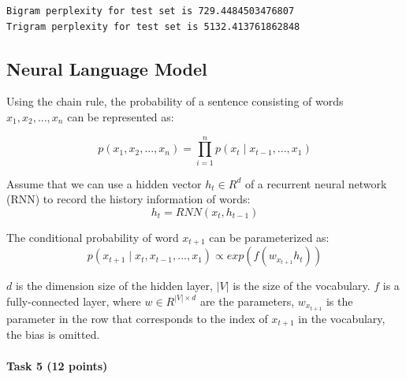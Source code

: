 \documentclass[11pt]{article}
\begin{document}
    \begin{Verbatim}[commandchars=\\\{\}]
Bigram perplexity for test set is 729.4484503476807
Trigram perplexity for test set is 5132.413761862848

    \end{Verbatim}

    \hypertarget{neural-language-model}{%
\subsection{Neural Language Model}\label{neural-language-model}}

Using the chain rule, the probability of a sentence consisting of words
\(x_1, x_2, ..., x_n\) can be represented as:

\[p(x_1, x_2, ..., x_n) = \prod_{i=1}^n p(x_t \mid x_{t-1}, ..., x_1)\]

Assume that we can use a hidden vector \(h_t\in R^d\) of a recurrent
neural network (RNN) to record the history information of words:
\[h_t = RNN(x_t, h_{t-1})\]

The conditional probability of word \(x_{t+1}\) can be parameterized as:
\[p(x_{t+1} \mid x_{t}, x_{t-1}, ..., x_1) \propto exp(f(w_{x_{t+1}}h_{t}))\]

\(d\) is the dimension size of the hidden layer, \(|V|\) is the size of
the vocabulary. \(f\) is a fully-connected layer, where
\(w \in R^{|V| \times d}\) are the parameters, \(w_{x_{t+1}}\) is the
parameter in the row that corresponds to the index of \(x_{t+1}\) in the
vocabulary, the bias is omitted.

    \hypertarget{task-5-12-points}{%
\paragraph{Task 5 (12 points)}\label{task-5-12-points}}
\end{document}
